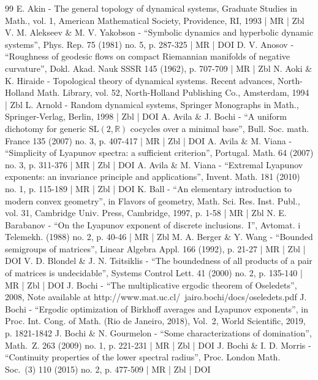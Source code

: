 \begin{thebibliography}{99}
E. Akin - The general topology of dynamical systems, Graduate Studies in Math., vol. 1, American Mathematical Society, Providence, RI, 1993 | MR | Zbl
V. M. Alekseev \& M. V. Yakobson - “Symbolic dynamics and hyperbolic dynamic systems”, Phys. Rep. 75 (1981) no. 5, p. 287-325 | MR | DOI
D. V. Anosov - “Roughness of geodesic flows on compact Riemannian manifolds of negative curvature”, Dokl. Akad. Nauk SSSR 145 (1962), p. 707-709 | MR | Zbl
N. Aoki \& K. Hiraide - Topological theory of dynamical systems. Recent advances, North-Holland Math. Library, vol. 52, North-Holland Publishing Co., Amsterdam, 1994 | Zbl
L. Arnold - Random dynamical systems, Springer Monographs in Math., Springer-Verlag, Berlin, 1998 | Zbl | DOI
A. Avila \& J. Bochi - “A uniform dichotomy for generic $\mathrm{SL}(2,\mathbb{R})$ cocycles over a minimal base”, Bull. Soc. math. France 135 (2007) no. 3, p. 407-417 | MR | Zbl | DOI
A. Avila \& M. Viana - “Simplicity of Lyapunov spectra: a sufficient criterion”, Portugal. Math. 64 (2007) no. 3, p. 311-376 | MR | Zbl | DOI
A. Avila \& M. Viana - “Extremal Lyapunov exponents: an invariance principle and applications”, Invent. Math. 181 (2010) no. 1, p. 115-189 | MR | Zbl | DOI
K. Ball - “An elementary introduction to modern convex geometry”, in Flavors of geometry, Math. Sci. Res. Inst. Publ., vol. 31, Cambridge Univ. Press, Cambridge, 1997, p. 1-58 | MR | Zbl
N. E. Barabanov - “On the Lyapunov exponent of discrete inclusions. I”, Avtomat. i Telemekh. (1988) no. 2, p. 40-46 | MR | Zbl
M. A. Berger \& Y. Wang - “Bounded semigroups of matrices”, Linear Algebra Appl. 166 (1992), p. 21-27 | MR | Zbl | DOI
V. D. Blondel \& J. N. Tsitsiklis - “The boundedness of all products of a pair of matrices is undecidable”, Systems Control Lett. 41 (2000) no. 2, p. 135-140 | MR | Zbl | DOI
J. Bochi - “The multiplicative ergodic theorem of Oseledets”, 2008, Note available at http://www.mat.uc.cl/~jairo.bochi/docs/oseledets.pdf
J. Bochi - “Ergodic optimization of Birkhoff averages and Lyapunov exponents”, in Proc. Int. Cong. of Math. (Rio de Janeiro, 2018), Vol. 2, World Scientific, 2019, p. 1821-1842
J. Bochi \& N. Gourmelon - “Some characterizations of domination”, Math. Z. 263 (2009) no. 1, p. 221-231 | MR | Zbl | DOI
J. Bochi \& I. D. Morris - “Continuity properties of the lower spectral radius”, Proc. London Math. Soc. (3) 110 (2015) no. 2, p. 477-509 | MR | Zbl | DOI

\end{thebibliography}
